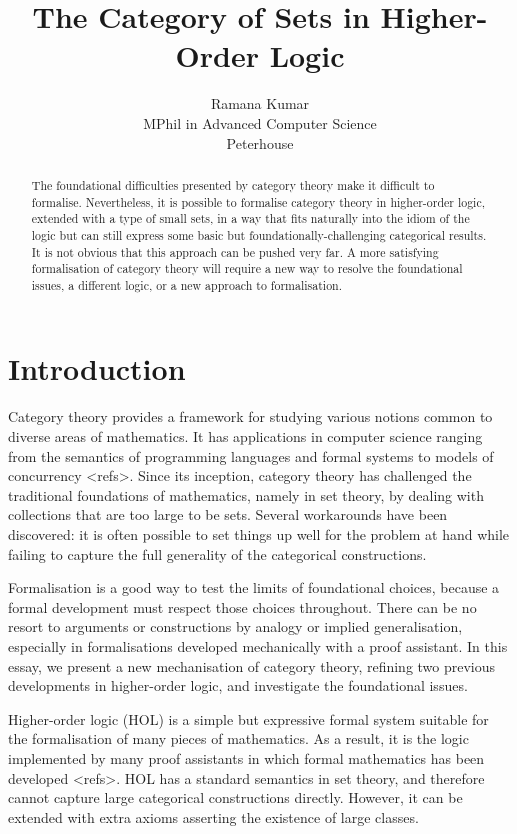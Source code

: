 \documentclass[twoside,titlepage,11pt]{article}
\title{The Category of Sets in Higher-Order Logic}
\author{Ramana Kumar\\MPhil in Advanced Computer Science\\Peterhouse}
\begin{document}
\maketitle
\begin{abstract}%
The foundational difficulties presented by category theory make it difficult to formalise.
Nevertheless, it is possible to formalise category theory in higher-order logic, extended with a type of small sets, in a way that fits naturally into the idiom of the logic but can still express some basic but foundationally-challenging categorical results.
It is not obvious that this approach can be pushed very far.
A more satisfying formalisation of category theory will require a new way to resolve the foundational issues, a different logic, or a new approach to formalisation.
\end{abstract}%
\section{Introduction}%
Category theory provides a framework for studying various notions common to diverse areas of mathematics.
It has applications in computer science ranging from the semantics of programming languages and formal systems to models of concurrency <refs>.
Since its inception, category theory has challenged the traditional foundations of mathematics, namely in set theory, by dealing with collections that are too large to be sets. 
Several workarounds have been discovered: it is often possible to set things up well for the problem at hand while failing to capture the full generality of the categorical constructions.

Formalisation is a good way to test the limits of foundational choices, because a formal development must respect those choices throughout.
There can be no resort to arguments or constructions by analogy or implied generalisation, especially in formalisations developed mechanically with a proof assistant.
In this essay, we present a new mechanisation of category theory, refining two previous developments in higher-order logic, and investigate the foundational issues.

Higher-order logic (HOL) is a simple but expressive formal system suitable for the formalisation of many pieces of mathematics.
As a result, it is the logic implemented by many proof assistants in which formal mathematics has been developed <refs>.
HOL has a standard semantics in set theory, and therefore cannot capture large categorical constructions directly.
However, it can be extended with extra axioms asserting the existence of large classes.
\end{document}
